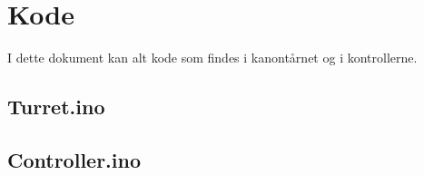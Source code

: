 \section*{Kode}
I dette dokument kan alt kode som findes i kanontårnet og i kontrollerne. 

\subsection*{Turret.ino}



\subsection*{Controller.ino}
